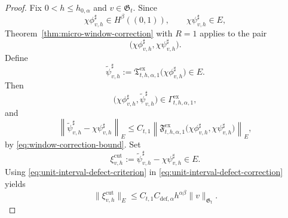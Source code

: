 \documentclass[11pt,a4paper]{amsart}
\theoremstyle{plain}
\theoremstyle{definition}
\theoremstyle{remark}
\begin{document}
\begin{proof}
Fix \(0<h\le h_{0,\alpha}\) and \(v\in\mathfrak G_t\). Since
\[
\chi\phi_{v,h}^{\sharp}\in H^\beta((0,1)),
\qquad
\chi\psi_{v,h}^{\sharp}\in E,
\]
Theorem~\ref{thm:micro-window-correction} with \(R=1\) applies to the pair
\[
\bigl(
\chi\phi_{v,h}^{\sharp},
\chi\psi_{v,h}^{\sharp}
\bigr).
\]
Define
\[
\widetilde\psi_{v,h}^{\sharp}
:=
\mathfrak T_{t,h,\alpha,1}^{\mathrm{ex}}
\bigl(
\chi\phi_{v,h}^{\sharp}
\bigr)
\in E.
\]
Then
\[
\bigl(
\chi\phi_{v,h}^{\sharp},
\widetilde\psi_{v,h}^{\sharp}
\bigr)
\in
\Gamma_{t,h,\alpha,1}^{\mathrm{ex}},
\]
and
\begin{equation}\label{eq:unit-interval-defect-correction}
\left\|
\widetilde\psi_{v,h}^{\sharp}
-\chi\psi_{v,h}^{\sharp}
\right\|_{E}
\le
C_{t,1}
\left\|
\mathfrak F_{t,h,\alpha,1}^{\mathrm{ex}}
\bigl(
\chi\phi_{v,h}^{\sharp},
\chi\psi_{v,h}^{\sharp}
\bigr)
\right\|_{E},
\end{equation}
by \eqref{eq:window-correction-bound}. Set
\[
\xi_{v,h}^{\mathrm{cut}}
:=
\widetilde\psi_{v,h}^{\sharp}
-\chi\psi_{v,h}^{\sharp}
\in E.
\]
Using \eqref{eq:unit-interval-defect-criterion} in
\eqref{eq:unit-interval-defect-correction} yields
\[
\|\xi_{v,h}^{\mathrm{cut}}\|_{E}
\le
C_{t,1}C_{\mathrm{def},\alpha}h^{\alpha\beta}\|v\|_{\mathfrak G_t}.
\]


\end{proof}
\end{document}
